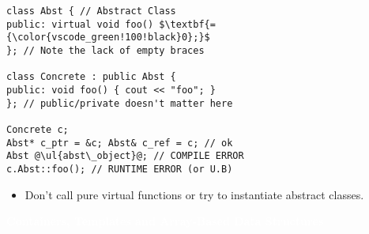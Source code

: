 \documentclass[7pt, twocolumn]{extarticle}
\begin{document}
\begin{small}
\begin{minipage}[h]{5.8cm}
   \end{minipage}
   \hspace{0pt}
   \begin{minipage}[h]{4.4cm} \small
   \begin{tcolorbox}[top=-5pt,bottom=-5pt,left=-1pt,right=-1pt,boxrule=0.5pt,arc=0pt]
              {
              \begin{lstlisting}[style = mystyle,mathescape=true]
class Abst { // Abstract Class
public: virtual void foo() $\textbf{= {\color{vscode_green!100!black}0};}$
}; // Note the lack of empty braces

class Concrete : public Abst {
public: void foo() { cout << "foo"; }
}; // public/private doesn't matter here

Concrete c;
Abst* c_ptr = &c; Abst& c_ref = c; // ok
Abst @\ul{abst\_object}@; // COMPILE ERROR
c.Abst::foo(); // RUNTIME ERROR (or U.B)
\end{lstlisting}
}
\end{tcolorbox}
\begin{itemize}[leftmargin=*,align=parleft]
\setlength\itemsep{0pt}
\item[\textcolor{error}{\faExclamationCircle}] Don't call pure virtual functions or try to instantiate abstract classes.
\end{itemize}
\end{minipage}

\begin{tcolorbox}[boxrule=0pt,left=1mm,right=1mm,top=0.75mm,bottom=0.75mm,boxsep=0mm,colback=violet!80!Lavender,frame empty,arc=0mm,fontupper=\large\sffamily\bfseries]
\begin{center}
    \small{\textcolor{white}{\textbf{Containers, Templates and Array-Based Data Structures}}}
\end{center}
\end{tcolorbox}


\end{small}
\end{document}

